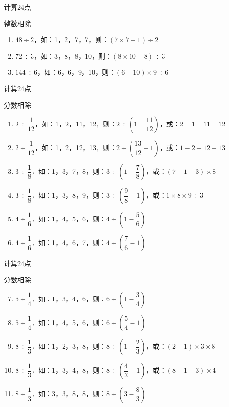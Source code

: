 \documentclass[aspectratio=169]{ctexbeamer} %
\begin{document}
\begin{frame}[t]{计算24点}
\begin{spacing}{2.5}
\normalsize
\alert{整数相除}
\begin{enumerate}[label={\arabic*.}]
\item $48 \div 2$，如：1，2，7，7，则：$(7 \times 7 - 1) \div 2$
\item $72 \div 3$，如：3，8，8，10，则：$(8 \times 10 - 8) \div 3$
\item  $144 \div 6$，如：6，6，9，10，则：$(6 + 10) \times 9 \div 6$
\end{enumerate}
\end{spacing}
\end{frame}

\begin{frame}[t]{计算24点}
\begin{spacing}{2.0}
\normalsize
\alert{分数相除}
\begin{enumerate}[label={\arabic*.}]
\item $2 \div \dfrac{1}{12}$，如：1，2，11，12，则：$2 \div (1- \dfrac{11}{12})$，或：$2 - 1 + 11 + 12$
\item $2 \div \dfrac{1}{12}$，如：1，2，12，13，则：$2 \div (\dfrac{13}{12} - 1)$，或：$1 - 2 + 12 + 13$
\item $3 \div \dfrac{1}{8}$，如：1，3，7，8，则：$3 \div (1 - \dfrac{7}{8})$，或：$(7 - 1 - 3) \times 8$
\item $3 \div \dfrac{1}{8}$，如：1，3，8，9，则：$3 \div (\dfrac{9}{8} - 1)$，或：$1 \times 8 \times 9 \div 3$
\item $4 \div \dfrac{1}{6}$，如：1，4，5，6，则：$4 \div (1 - \dfrac{5}{6})$
\item $4 \div \dfrac{1}{6}$，如：1，4，6，7，则：$4 \div (\dfrac{7}{6} - 1)$
\end{enumerate}
\end{spacing}
\end{frame}

\begin{frame}[t]{计算24点}
\begin{spacing}{2.0}
\normalsize
\alert{分数相除}
\begin{enumerate}[label={\arabic*.}]
\setcounter{enumi}{6}
\item $6 \div \dfrac{1}{4}$，如：1，3，4，6，则：$6 \div (1- \dfrac{3}{4})$
\item $6 \div \dfrac{1}{4}$，如：1，4，5，6，则：$6 \div (\dfrac{5}{4} - 1)$
\item $8 \div \dfrac{1}{3}$，如：1，2，3，8，则：$8 \div (1 - \dfrac{2}{3})$，或：$(2 - 1) \times 3 \times 8$
\item $8 \div \dfrac{1}{3}$，如：1，3，4，8，则：$8 \div (\dfrac{4}{3} - 1)$，或：$(8 + 1 - 3) \times 4$
\item $8 \div \dfrac{1}{3}$，如：3，3，8，8，则：$8 \div (3 - \dfrac{8}{3})$
\end{enumerate}
\end{spacing}
\end{frame}
\end{document}
